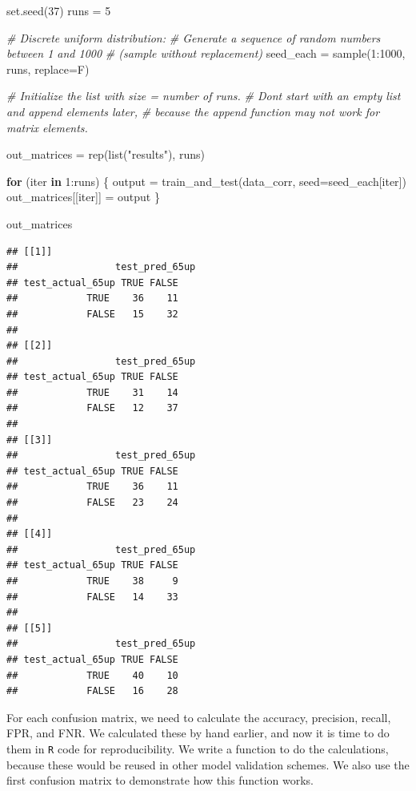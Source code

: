 \documentclass[
]{article}
\newenvironment{Shaded}{\begin{snugshade}}{\end{snugshade}}
\newcommand{\AttributeTok}[1]{\textcolor[rgb]{0.77,0.63,0.00}{#1}}
\newcommand{\CommentTok}[1]{\textcolor[rgb]{0.56,0.35,0.01}{\textit{#1}}}
\newcommand{\ControlFlowTok}[1]{\textcolor[rgb]{0.13,0.29,0.53}{\textbf{#1}}}
\newcommand{\DecValTok}[1]{\textcolor[rgb]{0.00,0.00,0.81}{#1}}
\newcommand{\FunctionTok}[1]{\textcolor[rgb]{0.00,0.00,0.00}{#1}}
\newcommand{\NormalTok}[1]{#1}
\newcommand{\OtherTok}[1]{\textcolor[rgb]{0.56,0.35,0.01}{#1}}
\newcommand{\SpecialCharTok}[1]{\textcolor[rgb]{0.00,0.00,0.00}{#1}}
\newcommand{\StringTok}[1]{\textcolor[rgb]{0.31,0.60,0.02}{#1}}
\begin{document}
\begin{Shaded}
\begin{Highlighting}[]
\FunctionTok{set.seed}\NormalTok{(}\DecValTok{37}\NormalTok{)}
\NormalTok{runs }\OtherTok{=} \DecValTok{5}

\CommentTok{\# Discrete uniform distribution:}
\CommentTok{\# Generate a sequence of random numbers between 1 and 1000 }
\CommentTok{\# (sample without replacement)}
\NormalTok{seed\_each }\OtherTok{=} \FunctionTok{sample}\NormalTok{(}\DecValTok{1}\SpecialCharTok{:}\DecValTok{1000}\NormalTok{, runs, }\AttributeTok{replace=}\NormalTok{F)}

\CommentTok{\# Initialize the list with size = number of runs.}
\CommentTok{\# Don\textquotesingle{}t start with an empty list and append elements later, }
\CommentTok{\# because the append function may not work for matrix elements.}

\NormalTok{out\_matrices }\OtherTok{=} \FunctionTok{rep}\NormalTok{(}\FunctionTok{list}\NormalTok{(}\StringTok{"results"}\NormalTok{), runs) }

\ControlFlowTok{for}\NormalTok{ (iter }\ControlFlowTok{in} \DecValTok{1}\SpecialCharTok{:}\NormalTok{runs) \{}
\NormalTok{  output }\OtherTok{=} \FunctionTok{train\_and\_test}\NormalTok{(data\_corr, }\AttributeTok{seed=}\NormalTok{seed\_each[iter])}
\NormalTok{  out\_matrices[[iter]] }\OtherTok{=}\NormalTok{ output}
\NormalTok{\}}

\NormalTok{out\_matrices}
\end{Highlighting}
\end{Shaded}

\begin{verbatim}
## [[1]]
##                 test_pred_65up
## test_actual_65up TRUE FALSE
##            TRUE    36    11
##            FALSE   15    32
## 
## [[2]]
##                 test_pred_65up
## test_actual_65up TRUE FALSE
##            TRUE    31    14
##            FALSE   12    37
## 
## [[3]]
##                 test_pred_65up
## test_actual_65up TRUE FALSE
##            TRUE    36    11
##            FALSE   23    24
## 
## [[4]]
##                 test_pred_65up
## test_actual_65up TRUE FALSE
##            TRUE    38     9
##            FALSE   14    33
## 
## [[5]]
##                 test_pred_65up
## test_actual_65up TRUE FALSE
##            TRUE    40    10
##            FALSE   16    28
\end{verbatim}

For each confusion matrix, we need to calculate the accuracy, precision,
recall, FPR, and FNR. We calculated these by hand earlier, and now it is
time to do them in \texttt{R} code for reproducibility. We write a
function to do the calculations, because these would be reused in other
model validation schemes. We also use the first confusion matrix to
demonstrate how this function works.
\end{document}

